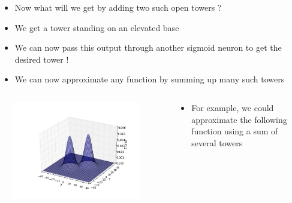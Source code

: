 \begin{frame}
\begin{columns}
\begin{overlayarea}{\textwidth}{\textheight}
{			}
		\end{overlayarea}
		\begin{overlayarea}{\textwidth}{\textheight}
			\begin{itemize}\justifying
				\item<1-> Now what will we get by adding two such open towers ?
				\item<4-> We get a tower standing on an elevated base
				\item<5-> We can now pass this output through another sigmoid neuron to get the desired tower !
				\item<7-> We can now approximate any function by summing up many such towers
			\end{itemize}
		\end{overlayarea}
	\end{columns}
\end{frame}

\begin{frame}
	\begin{columns}
		\begin{overlayarea}{\textwidth}{\textheight}
			\begin{figure}
				\includegraphics[scale=0.25]{images/module5/Plots/2bells}
			\end{figure}
		\end{overlayarea}
		\begin{overlayarea}{\textwidth}{\textheight}
			\begin{itemize}\justifying
				\item For example, we could approximate the following function using a sum of several towers
			\end{itemize}
		\end{overlayarea}
	\end{columns}
\end{frame}

